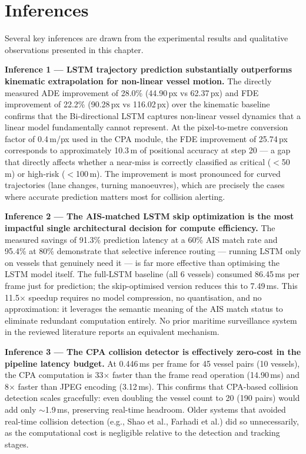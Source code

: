 \section{Inferences}

Several key inferences are drawn from the experimental results and 
qualitative observations presented in this chapter.

\textbf{Inference 1 — LSTM trajectory prediction substantially outperforms kinematic extrapolation for non-linear vessel motion.}
The directly measured ADE improvement of 28.0\% (44.90\,px vs 62.37\,px) and FDE improvement of 22.2\% (90.28\,px vs 116.02\,px) over the kinematic baseline confirms that the Bi-directional LSTM captures non-linear vessel dynamics that a linear model fundamentally cannot represent. At the pixel-to-metre conversion factor of 0.4\,m/px used in the CPA module, the FDE improvement of 25.74\,px corresponds to approximately 10.3\,m of positional accuracy at step 20 — a gap that directly affects whether a near-miss is correctly classified as critical ($<$50\,m) or high-risk ($<$100\,m). The improvement is most pronounced for curved trajectories (lane changes, turning manoeuvres), which are precisely the cases where accurate prediction matters most for collision alerting.

\textbf{Inference 2 — The AIS-matched LSTM skip optimization is the most impactful single architectural decision for compute efficiency.}
The measured savings of 91.3\% prediction latency at a 60\% AIS match rate and 95.4\% at 80\% demonstrate that selective inference routing — running LSTM only on vessels that genuinely need it — is far more effective than optimising the LSTM model itself. The full-LSTM baseline (all 6 vessels) consumed 86.45\,ms per frame just for prediction; the skip-optimised version reduces this to 7.49\,ms. This 11.5$\times$ speedup requires no model compression, no quantisation, and no approximation: it leverages the semantic meaning of the AIS match status to eliminate redundant computation entirely. No prior maritime surveillance system in the reviewed literature reports an equivalent mechanism.

\textbf{Inference 3 — The CPA collision detector is effectively zero-cost in the pipeline latency budget.}
At 0.446\,ms per frame for 45 vessel pairs (10 vessels), the CPA computation is 33$\times$ faster than the frame read operation (14.90\,ms) and 8$\times$ faster than JPEG encoding (3.12\,ms). This confirms that CPA-based collision detection scales gracefully: even doubling the vessel count to 20 (190 pairs) would add only $\sim$1.9\,ms, preserving real-time headroom. Older systems that avoided real-time collision detection (e.g., Shao et al., Farhadi et al.) did so unnecessarily, as the computational cost is negligible relative to the detection and tracking stages.

